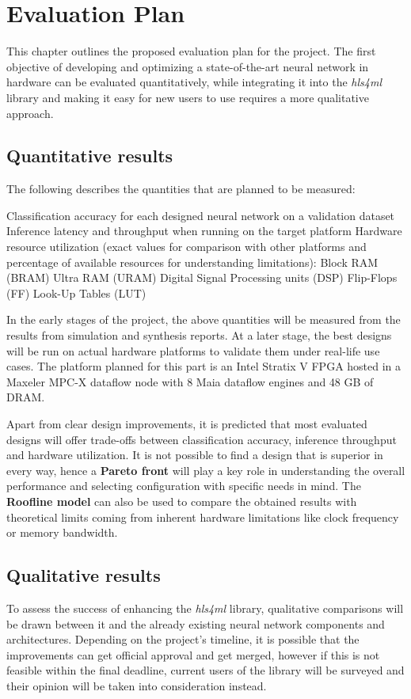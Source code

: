 \chapter{Evaluation Plan}
This chapter outlines the proposed evaluation plan for the project. The first objective of developing and optimizing a state-of-the-art neural network in hardware can be evaluated quantitatively, while integrating it into the \textit{hls4ml} library and making it easy for new users to use requires a more qualitative approach.

\section{Quantitative results}
The following describes the quantities that are planned to be measured:

\begin{outline}
  \1 Classification accuracy for each designed neural network on a validation dataset
  \1 Inference latency and throughput when running on the target platform
  \1 Hardware resource utilization (exact values for comparison with other platforms and percentage of available resources for understanding limitations):
    \2 Block RAM (BRAM)
    \2 Ultra RAM (URAM)
    \2 Digital Signal Processing units (DSP)
    \2 Flip-Flops (FF)
    \2 Look-Up Tables (LUT)
\end{outline}

In the early stages of the project, the above quantities will be measured from the results from simulation and synthesis reports. At a later stage, the best designs will be run on actual hardware platforms to validate them under real-life use cases. The platform planned for this part is an Intel Stratix V FPGA hosted in a Maxeler MPC-X dataflow node with 8 Maia dataflow engines and 48 GB of DRAM.

Apart from clear design improvements, it is predicted that most evaluated designs will offer trade-offs between classification accuracy, inference throughput and hardware utilization. It is not possible to find a design that is superior in every way, hence a \textbf{Pareto front} will play a key role in understanding the overall performance and selecting configuration with specific needs in mind. The \textbf{Roofline model} can also be used to compare the obtained results with theoretical limits coming from inherent hardware limitations like clock frequency or memory bandwidth.


\section{Qualitative results}
To assess the success of enhancing the \textit{hls4ml} library, qualitative comparisons will be drawn between it and the already existing neural network components and architectures. Depending on the project's timeline, it is possible that the improvements can get official approval and get merged, however if this is not feasible within the final deadline, current users of the library will be surveyed and their opinion will be taken into consideration instead.
